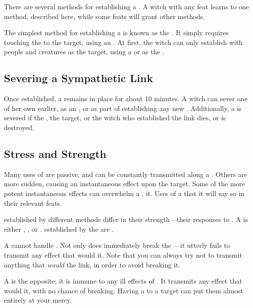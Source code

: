 There are several methods for establishing a {\symlink}.
A witch with any  feat learns to one method, described here, while some feats will grant other methods.

The simplest method for establishing a {\symlink} is known as the {\methodofcontagion}.
It simply requires touching the {\symbol} to the target, using an {\action}.
At first, the witch can only establish {\symlinks} with people and creatures as the target, using a  or  as the {\symbol}.

\subsection{Severing a Sympathetic Link}

Once established, a {\symlink} remains in place for about 10 minutes.
A witch can sever one of her own {\symlinks} earlier, as an {\action}, or as part of establishing any new {\symlink}.
Additionally, a {\symlink} is severed if the {\symbol}, the target, or the witch who established the link dies, or is destroyed.

\subsection{Stress and Strength}

Many uses of  are passive, and can be constantly transmitted along a {\symlink}.
Others are more sudden, causing an instantaneous effect upon the target.
Some of the more potent instantaneous effects can overwhelm a {\symlink}, {\stressing} it.
Uses of a {\symlink} that {\stress} it will say so in their relevant feats.

\capital{\symlinks} established by different methods differ in their strength---their responses to {\stress}.
A {\symlink} is either {\weaksymlinkbare}, {\standardsymlinkbare}, or {\strongsymlinkbare}.
\capital{\symlinks} established by the {\methodofcontagion} are {\standardsymlinkbare}.

A {\weaksymlink} cannot handle {\stress}.
Not only does {\stress} immediately break the {\symlink}---it utterly fails to transmit any effect that would {\stress} it.
Note that you can always try not to transmit anything that \emph{would} {\stress} the link, in order to avoid breaking it.

A {\strongsymlink} is the opposite; it is immune to any ill effects of {\stress}.
It transmits any effect that would {\stress} it, with no chance of breaking.
Having a {\strongsymlink} to a target can put them almost entirely at your mercy.

